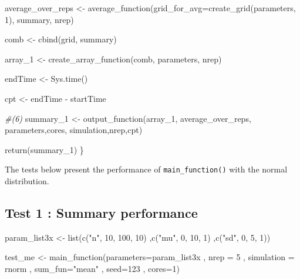 \documentclass[11pt,a4paper]{article}
\newenvironment{Shaded}{\begin{snugshade}}{\end{snugshade}}
\newcommand{\AttributeTok}[1]{\textcolor[rgb]{0.77,0.63,0.00}{#1}}
\newcommand{\CommentTok}[1]{\textcolor[rgb]{0.56,0.35,0.01}{\textit{#1}}}
\newcommand{\DecValTok}[1]{\textcolor[rgb]{0.00,0.00,0.81}{#1}}
\newcommand{\FunctionTok}[1]{\textcolor[rgb]{0.00,0.00,0.00}{#1}}
\newcommand{\NormalTok}[1]{#1}
\newcommand{\OtherTok}[1]{\textcolor[rgb]{0.56,0.35,0.01}{#1}}
\newcommand{\SpecialCharTok}[1]{\textcolor[rgb]{0.00,0.00,0.00}{#1}}
\newcommand{\StringTok}[1]{\textcolor[rgb]{0.31,0.60,0.02}{#1}}
\begin{document}
\begin{Shaded}
\begin{Highlighting}[]
\NormalTok{  average\_over\_reps }\OtherTok{\textless{}{-}} \FunctionTok{average\_function}\NormalTok{(}\AttributeTok{grid\_for\_avg=}\FunctionTok{create\_grid}\NormalTok{(parameters, }\DecValTok{1}\NormalTok{),}
\NormalTok{                                        summary, nrep)}
  
\NormalTok{  comb }\OtherTok{\textless{}{-}} \FunctionTok{cbind}\NormalTok{(grid, summary) }
  
\NormalTok{  array\_1 }\OtherTok{\textless{}{-}} \FunctionTok{create\_array\_function}\NormalTok{(comb, parameters, nrep) }
  
\NormalTok{  endTime }\OtherTok{\textless{}{-}} \FunctionTok{Sys.time}\NormalTok{()}
  
\NormalTok{  cpt }\OtherTok{\textless{}{-}}\NormalTok{ endTime }\SpecialCharTok{{-}}\NormalTok{ startTime}
  
  \CommentTok{\#(6)}
\NormalTok{  summary\_1 }\OtherTok{\textless{}{-}} \FunctionTok{output\_function}\NormalTok{(array\_1,}
\NormalTok{                               average\_over\_reps,}
\NormalTok{                               parameters,cores,}
\NormalTok{                               simulation,nrep,cpt)}
  
\FunctionTok{return}\NormalTok{(summary\_1)}
\NormalTok{\}}
\end{Highlighting}
\end{Shaded}

The tests below present the performance of \texttt{main\_function()}
with the normal distribution.

\hypertarget{test-1-summary-performance}{%
\subsection{Test 1 : Summary
performance}\label{test-1-summary-performance}}

\begin{Shaded}
\begin{Highlighting}[]
\NormalTok{param\_list3x }\OtherTok{\textless{}{-}} \FunctionTok{list}\NormalTok{(}\FunctionTok{c}\NormalTok{(}\StringTok{"n"}\NormalTok{, }\DecValTok{10}\NormalTok{, }\DecValTok{100}\NormalTok{, }\DecValTok{10}\NormalTok{)}
\NormalTok{                     ,}\FunctionTok{c}\NormalTok{(}\StringTok{"mu"}\NormalTok{, }\DecValTok{0}\NormalTok{, }\DecValTok{10}\NormalTok{, }\DecValTok{1}\NormalTok{)}
\NormalTok{                     ,}\FunctionTok{c}\NormalTok{(}\StringTok{"sd"}\NormalTok{, }\DecValTok{0}\NormalTok{, }\DecValTok{5}\NormalTok{, }\DecValTok{1}\NormalTok{))}

\NormalTok{test\_me }\OtherTok{\textless{}{-}} \FunctionTok{main\_function}\NormalTok{(}\AttributeTok{parameters=}\NormalTok{param\_list3x}
\NormalTok{              , }\AttributeTok{nrep =} \DecValTok{5}
\NormalTok{              , }\AttributeTok{simulation =}\NormalTok{ rnorm}
\NormalTok{              , }\AttributeTok{sum\_fun=}\StringTok{"mean"}
\NormalTok{              , }\AttributeTok{seed=}\DecValTok{123} 
\NormalTok{              , }\AttributeTok{cores=}\DecValTok{1}\NormalTok{)}
\end{Highlighting}
\end{Shaded}
\end{document}
